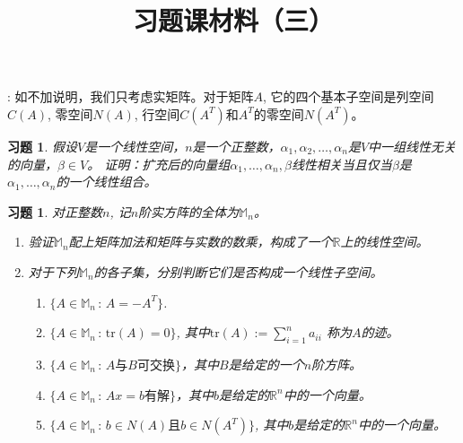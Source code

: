 \documentclass[UTF8]{ctexart}
\newtheorem{ex}[thm]{习题}
\begin{document}
\title{习题课材料（三）}

\date{}

\maketitle

\vspace{-1cm}






\medskip

: 如不加说明，我们只考虑实矩阵。对于矩阵$A$, 它的四个基本子空间是列空间$C(A)$, 零空间$N(A)$, 行空间$C(A^T)$和$A^T$的零空间$N(A^T)$。
\medskip

\begin{ex} 假设$V$是一个线性空间，$n$是一个正整数，$\alpha_1,\alpha_2,\dots,\alpha_n$是$V$中一组线性无关的向量，$\beta \in V$。 证明：扩充后的向量组$\alpha_1,\dots,\alpha_n,\beta$线性相关当且仅当$\beta$是$\alpha_1,\dots,\alpha_n$的一个线性组合。
\end{ex}



\begin{ex} 对正整数$n$, 记$n$阶实方阵的全体为$\mathbb{M}_n$。
\begin{enumerate}
\item 验证$\mathbb{M}_n$配上矩阵加法和矩阵与实数的数乘，构成了一个$\mathbb{R}$上的线性空间。
\item 对于下列$\mathbb{M}_n$的各子集，分别判断它们是否构成一个线性子空间。
\begin{enumerate}
\item $\{A \in \mathbb{M}_n \,:\, A = -A^T\}$.
\item $\{A \in \mathbb{M}_n \,:\, \mathrm{tr} (A) = 0\}$, 其中$\mathrm{tr}(A) := \sum_{i=1}^n a_{ii}$ 称为$A$的迹。
\item $\{A \in \mathbb{M}_n \,:\, \text{$A$与$B$可交换}\}$，其中$B$是给定的一个$n$阶方阵。
\item $\{A \in \mathbb{M}_n \,:\, \text{$Ax = b$有解}\}$，其中$b$是给定的$\mathbb{R}^n$中的一个向量。
\item $\{A \in \mathbb{M}_n \,:\, \text{$b\in N(A)$且$b\in N(A^T)$}\}$, 其中$b$是给定的$\mathbb{R}^n$中的一个向量。
\end{enumerate}
\end{enumerate}
\end{ex}
\end{document}

